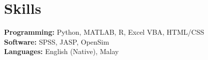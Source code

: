 \documentclass[../main.tex]{subfiles}
\begin{document}
\section{Skills}
  \vspace{2pt}
  \resumeSubHeadingListStart
    {\item{
        \textbf{Programming: }{Python, MATLAB, R, Excel VBA, HTML/CSS} \\ \vspace{2pt}
        \textbf{Software: }{SPSS, JASP, OpenSim} \\ \vspace{2pt}
        \textbf{Languages: }{English (Native), Malay} \\ \vspace{2pt}
        
    }}
  \resumeSubHeadingListEnd
\end{document}
